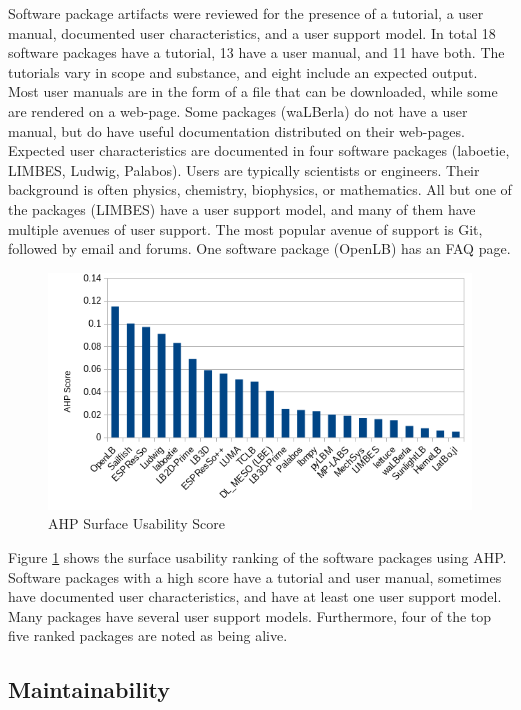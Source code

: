 \documentclass[12pt, notitlepage]{article}
\begin{document}
Software package artifacts were reviewed for the presence of a tutorial, a user manual, documented user characteristics, and a user support model. In total 18 software packages have a tutorial, 13 have a user manual, and 11 have both. The tutorials vary in scope and substance, and eight include an expected output. Most user manuals are in the form of a file that can be downloaded, while some are rendered on a web-page. Some packages (waLBerla) do not have a user manual, but do have useful documentation distributed on their web-pages. Expected user characteristics are documented in four software packages (laboetie, LIMBES, Ludwig, Palabos). Users are typically scientists or engineers. Their background is often physics, chemistry, biophysics, or mathematics. All but one of the packages (LIMBES) have a user support model, and many of them have multiple avenues of user support. The most popular avenue of support is Git, followed by email and forums. One software package (OpenLB) has an FAQ page.    

\begin{figure}[h!]
	\begin{center}
		\includegraphics[width=1.0\textwidth]{usability_chart}
		\caption{AHP Surface Usability Score}
		\label{Fig_Usability}
	\end{center}
\end{figure}

Figure \ref{Fig_Usability} shows the surface usability ranking of the software packages using AHP. Software packages with a high score have a tutorial and user manual, sometimes have documented user characteristics, and have at least one user support model. Many packages have several user support models. Furthermore, four of the top five ranked packages are noted as being alive. 

\subsection{Maintainability}
\end{document}
